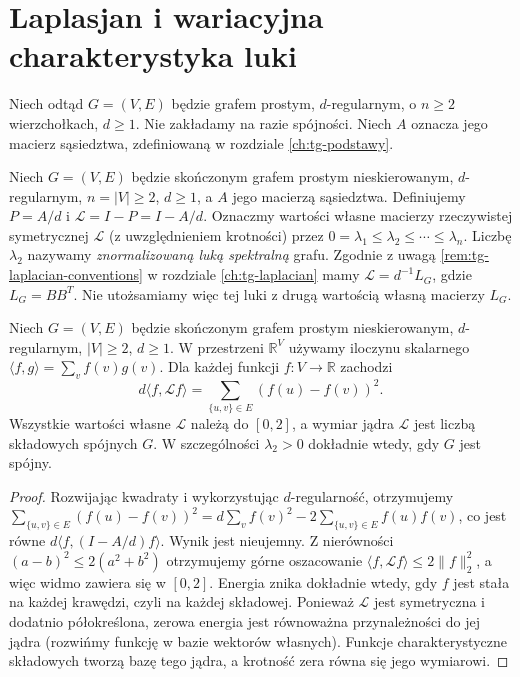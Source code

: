 \section{Laplasjan i wariacyjna charakterystyka luki}
\label{sec:tg-expanders-spectrum}

Niech odtąd $G=(V,E)$ będzie grafem prostym,
$d$-regularnym, o $n\geq2$ wierzchołkach, $d\geq1$.
Nie zakładamy na razie spójności.
Niech $A$ oznacza jego macierz sąsiedztwa,
zdefiniowaną w rozdziale \ref{ch:tg-podstawy}.

\begin{definicja}
\label{def:tg-expander-laplacian}
Niech $G=(V,E)$ będzie skończonym grafem prostym
nieskierowanym, $d$-regularnym, $n=|V|\geq2$, $d\geq1$,
a $A$ jego macierzą sąsiedztwa.
Definiujemy $P=A/d$ i $\mathcal L=I-P=I-A/d$.
Oznaczmy wartości własne macierzy
rzeczywistej symetrycznej $\mathcal L$
(z uwzględnieniem krotności)
przez
$0=\lambda_1\leq\lambda_2\leq\cdots\leq\lambda_n$.
Liczbę $\lambda_2$ nazywamy
\emph{znormalizowaną luką spektralną} grafu.
Zgodnie z uwagą \ref{rem:tg-laplacian-conventions}
w rozdziale \ref{ch:tg-laplacian} mamy
$\mathcal L=d^{-1}L_G$, gdzie $L_G=BB^T$.
Nie utożsamiamy więc tej luki z drugą wartością
własną macierzy $L_G$.
\end{definicja}

\begin{lemat}
\label{lem:tg-expander-energy}
Niech $G=(V,E)$ będzie skończonym grafem prostym
nieskierowanym, $d$-regularnym, $|V|\geq2$, $d\geq1$.
W przestrzeni $\mathbb R^V$ używamy iloczynu
skalarnego $\langle f,g\rangle=\sum_v f(v)g(v)$.
Dla każdej funkcji $f:V\to\mathbb R$ zachodzi
\[
d\langle f,\mathcal L f\rangle
=\sum_{\{u,v\}\in E}(f(u)-f(v))^2.
\]
Wszystkie wartości własne $\mathcal L$
należą do $[0,2]$, a wymiar jądra
$\mathcal L$ jest liczbą składowych spójnych $G$.
W szczególności
$\lambda_2>0$ dokładnie wtedy, gdy $G$ jest spójny.
\end{lemat}
\begin{proof}
Rozwijając kwadraty i wykorzystując
$d$-regularność, otrzymujemy
$\sum_{\{u,v\}\in E}(f(u)-f(v))^2
=d\sum_vf(v)^2-2\sum_{\{u,v\}\in E}f(u)f(v)$,
co jest równe $d\langle f,(I-A/d)f\rangle$.
Wynik jest nieujemny.
Z nierówności $(a-b)^2\leq2(a^2+b^2)$
otrzymujemy górne oszacowanie
$\langle f,\mathcal L f\rangle\leq2\|f\|_2^2$,
a więc widmo zawiera się w $[0,2]$.
Energia znika dokładnie wtedy,
gdy $f$ jest stała na każdej krawędzi,
czyli na każdej składowej.
Ponieważ $\mathcal L$ jest symetryczna i dodatnio
półokreślona, zerowa energia jest równoważna
przynależności do jej jądra (rozwińmy funkcję w bazie
wektorów własnych). Funkcje charakterystyczne składowych
tworzą bazę tego jądra, a krotność zera równa się
jego wymiarowi.
\end{proof}

